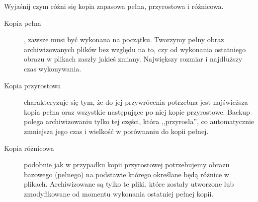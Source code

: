 \documentclass[answers,11pt]{exam}
\begin{document}
\begin{questions}
\question Wyjaśnij czym różni się kopia zapasowa pełna, przyrostowa i różnicowa.
\begin{solution}
\begin{description}
\item[Kopia pełna], zawsze musi być wykonana na początku. Tworzymy pełny obraz archiwizowanych plików bez względu na to, czy od wykonania ostatniego obrazu w plikach zaszły jakieś zmiany. Największy rozmiar i najdłuższy czas wykonywania.
\item[Kopia przyrostowa] charakteryzuje się tym, że do jej przywrócenia potrzebna jest najświeższa kopia pełna oraz wszystkie następujące po niej kopie przyrostowe. Backup polega archiwizowaniu tylko tej części, która ,,przyrosła'', co automatycznie zmniejsza jego czas i wielkość w porównaniu do kopii pełnej.
\item[Kopia różnicowa] podobnie jak w przypadku kopii przyrostowej potrzebujemy obrazu bazowego (pełnego) na podstawie którego określane będą różnice w plikach. Archiwizowane są tylko te pliki, które zostały utworzone lub zmodyfikowane od momentu wykonania ostatniej pełnej kopii.
\end{description}
\end{solution}


\end{questions}
\end{document}
